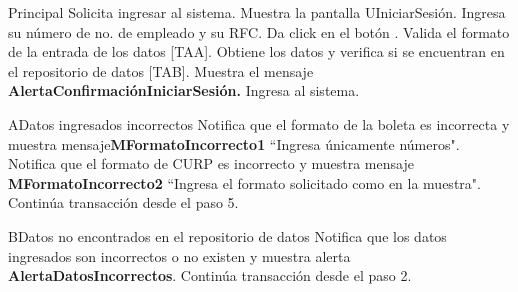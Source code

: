 \begin{UCtrayectoria}{Principal}
  \UCpaso[\UCactor] Solicita ingresar al sistema.
  \UCpaso Muestra la pantalla UIniciarSesión.
  \UCpaso[\UCactor] Ingresa su número de no. de empleado y su RFC.
  \UCpaso[\UCactor]Da click en el botón .
  \UCpaso Valida el formato de la entrada de los datos [TAA].
  \UCpaso Obtiene los datos y verifica si se encuentran en el repositorio de datos [TAB].
  \UCpaso Muestra el mensaje {\bf AlertaConfirmaciónIniciarSesión. }
  \UCpaso[\UCactor]Ingresa al sistema.
\end{UCtrayectoria}


\begin{UCtrayectoriaA}{A}{Datos ingresados incorrectos}
  \UCpaso Notifica que el formato de la boleta es incorrecta y muestra mensaje{\bf MFormatoIncorrecto1} ``Ingresa únicamente números".
  \UCpaso Notifica que el formato de CURP es incorrecto y muestra mensaje {\bf MFormatoIncorrecto2} ``Ingresa el formato solicitado como en la muestra".
  \UCpaso Continúa transacción desde el paso 5.
\end{UCtrayectoriaA}

\begin{UCtrayectoriaA}{B}{Datos no encontrados en el repositorio de datos}
  \UCpaso Notifica que los datos ingresados son incorrectos o no existen y muestra alerta {\bf AlertaDatosIncorrectos}.
  \UCpaso Continúa transacción desde el paso 2.
\end{UCtrayectoriaA}
